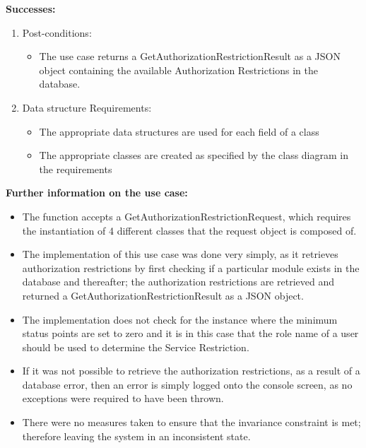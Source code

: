 \noindent
\textbf{Successes:}
\begin{enumerate}
\item Post-conditions:
	\begin{itemize}
		\item The use case returns a GetAuthorizationRestrictionResult as a JSON object containing the available Authorization Restrictions in the database.
	\end{itemize}

\item Data structure Requirements:
	\begin{itemize}
		\item The appropriate data structures are used for each field of a class
		\item The appropriate classes are created as specified by the class diagram in the requirements
	\end{itemize}

\end{enumerate}

\textbf{Further information on the use case:}
\noindent
\medskip

\begin{itemize}
	\item The function accepts a GetAuthorizationRestrictionRequest, which requires the instantiation of 4 different classes that the request object is composed of.

	\item The implementation of this use case was done very simply, as it retrieves authorization restrictions by first checking if a particular module exists in the database and thereafter; the authorization restrictions are retrieved and returned a GetAuthorizationRestrictionResult as a JSON object.

	\item The implementation does not check for the instance where the minimum status points are set to zero and it is in this case that the role name of a user should be used to determine the Service Restriction. 

	\item If it was not possible to retrieve the authorization restrictions, as a result of a database error, then an error is simply logged onto the console screen, as no exceptions were required to have been thrown.

	\item There were no measures taken to ensure that the invariance constraint is met; therefore leaving the system in an inconsistent state.
\end{itemize}


